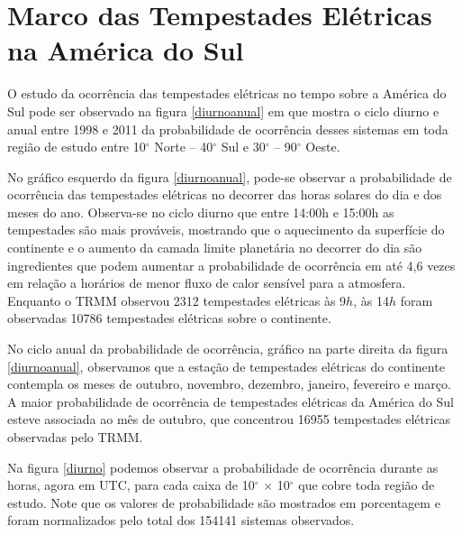 \chapter{Marco das Tempestades Elétricas na América do Sul }


O estudo da ocorrência das tempestades elétricas no tempo sobre a América do Sul pode ser observado na figura \ref{diurnoanual} em que mostra o ciclo diurno e anual entre 1998 e 2011 da probabilidade de ocorrência desses sistemas em toda região de estudo entre 10$^{\circ}$ Norte -- 40$^{\circ}$ Sul e 30$^{\circ}$  -- 90$^{\circ}$ Oeste.



No gráfico esquerdo da figura \ref{diurnoanual}, pode-se observar a probabilidade de ocorrência das tempestades elétricas no decorrer das horas solares do dia e dos meses do ano. Observa-se no ciclo diurno que entre 14:00h e 15:00h as tempestades são mais prováveis, mostrando que o aquecimento da superfície do continente e o aumento da camada limite planetária no decorrer do dia são ingredientes que podem aumentar a probabilidade de ocorrência em até 4,6 vezes em relação a horários de menor fluxo de calor sensível para a atmosfera. Enquanto o TRMM observou 2312 tempestades elétricas às 9$h$, às 14$h$ foram observadas 10786 tempestades elétricas sobre o continente.

No ciclo anual da probabilidade de ocorrência, gráfico na parte direita da figura \ref{diurnoanual}, observamos que a estação de tempestades elétricas do continente contempla os meses de outubro, novembro, dezembro, janeiro, fevereiro e março. A maior probabilidade de ocorrência de tempestades elétricas da América do Sul esteve associada ao mês de outubro, que concentrou 16955 tempestades elétricas observadas pelo TRMM. %

Na figura \ref{diurno} podemos observar a probabilidade de ocorrência durante as horas, agora em UTC, para cada caixa de 10$^{\circ}$ $\times$ 10$^{\circ}$ que cobre toda região de estudo. Note que os valores de probabilidade são mostrados em porcentagem e foram normalizados pelo total dos 154141 sistemas observados.



